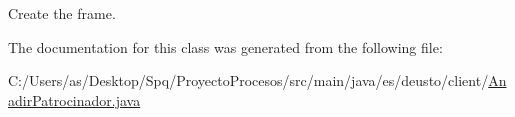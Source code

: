 Create the frame. 

The documentation for this class was generated from the following file\+:\begin{DoxyCompactItemize}
\item 
C\+:/\+Users/as/\+Desktop/\+Spq/\+Proyecto\+Procesos/src/main/java/es/deusto/client/\mbox{\hyperlink{_anadir_patrocinador_8java}{Anadir\+Patrocinador.\+java}}\end{DoxyCompactItemize}
